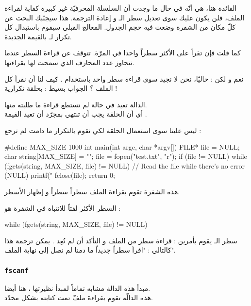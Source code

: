 الفائدة هنا، هي أنّه في حال ما وجدت أن السلسلة المحرفيّة غير كبيرة كفاية لقراءة الملف، فلن يكون عليك سوى تعديل سطر الـ
و إعادة الترجمة. هذا سيجنّبك البحث عن كلّ مكان من الشفرة وضعت فيه حجم الجدول. المعالج القبلي سيقوم باستبدال كل تكرار لـ
بالقيمة الجديدة.

كما قلت فإن
تقرأ على الأكثر سطراً واحدا في المرّة. تتوقف عن قراءة السطر عندما تتجاوز عدد المحارف الذي سمحت لها بقراءتها.

نعم و لكن : حاليّا، نحن لا نجيد سوى قراءة سطر واحد باستخدام
.
كيف لنا أن نقرأ كل الملف ؟ الجواب بسيط : بحلقة تكرارية !

الدالة
تعيد
في حالة لم تستطع قراءة ما طلبته منها.\\
أي أن الحلقة يجب أن تنتهي بمجرّد أن تعيد
القيمة
.

ليس علينا سوى استعمال الحلقة
لكي نقوم بالتكرار ما دامت
لم ترجع
 :

\begin{Csource}
#define MAX_SIZE 1000
int main(int argc, char *argv[])
{
    FILE* file = NULL;
    char string[MAX_SIZE] = "";
    file = fopen("test.txt", "r");
    if (file != NULL)
    {
        while (fgets(string, MAX_SIZE, file) != NULL) // Read the file while there's no error (NULL)
        {
            printf("%
        }
        fclose(file);
    }
    return 0;
}
\end{Csource}

هذه الشفرة تقوم بقراءة الملف سطراً سطراً و إظهار الأسطر.

السطر الأكثر لفتاً للانتباه في الشفرة هو :

\begin{Csource}
while (fgets(string, MAX_SIZE, file) != NULL)
\end{Csource}

سطر الـ
يقوم بأمرين : قراءة سطر من الملف و التأكد أن
لم تُعِد
.
يمكن ترجمة هذا كالتالي : "اقرأ سطراً جديداً ما دمنا لم نصل إلى نهاية الملف".

\subsubsection{\texttt{fscanf}}

مبدأ هذه الدالة مشابه تماماً لمبدأ نظيرتها
،
هنا أيضا.\\
هذه الدالّة تقوم بقراءة ملفّ تمت كتابته بشكل محدّد.

